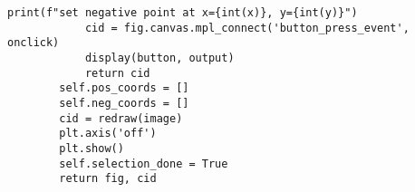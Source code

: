 \begin{lstlisting}[basicstyle=\ttfamily\small]
                    print(f"set negative point at x={int(x)}, y={int(y)}")
            cid = fig.canvas.mpl_connect('button_press_event', onclick)
            display(button, output)
            return cid
        self.pos_coords = []
        self.neg_coords = []
        cid = redraw(image)
        plt.axis('off')
        plt.show()
        self.selection_done = True
        return fig, cid
\end{lstlisting}